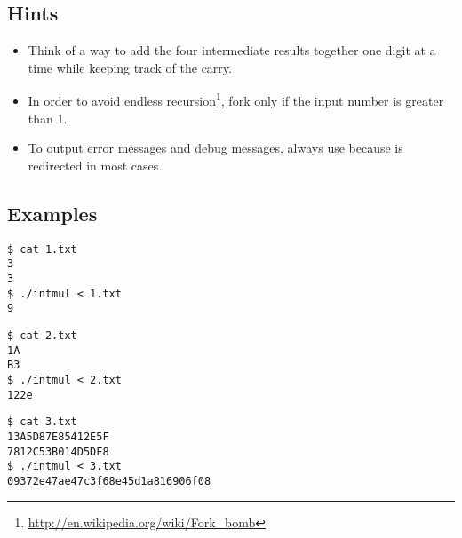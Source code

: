 \subsection*{Hints}

\begin{itemize}
\item Think of a way to add the four intermediate results together
one digit at a time while keeping track of the carry.
\item In order to avoid endless recursion\footnote{\url{http://en.wikipedia.org/wiki/Fork\_bomb}},
fork only if the input number is greater than 1.
\item To output error messages and debug messages, always use
 because  is redirected in most cases.
\end{itemize}

\subsection*{Examples}
\begin{multicols}{3}
\begin{verbatim}
$ cat 1.txt
3
3
$ ./intmul < 1.txt
9
\end{verbatim}

\begin{verbatim}
$ cat 2.txt
1A
B3
$ ./intmul < 2.txt
122e
\end{verbatim}

\begin{verbatim}
$ cat 3.txt
13A5D87E85412E5F
7812C53B014D5DF8
$ ./intmul < 3.txt
09372e47ae47c3f68e45d1a816906f08
\end{verbatim}
\end{multicols}

\osueguidelinestwo


